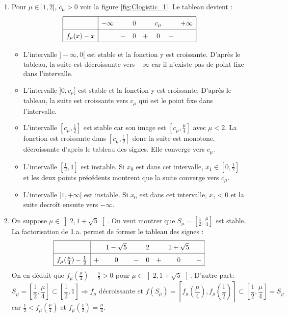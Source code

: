 \begin{enumerate}
 \item Pour $\mu \in ]1,2[$, $c_\mu >0$ voir la figure \ref{fig:Clogistic_1}. Le tableau devient :
\begin{displaymath}
\renewcommand{\arraystretch}{1.5}
 \begin{array}{|c|ccccccc|} \hline
           & -\infty &   & 0 &   & c_\mu &   & +\infty \\ \hline
f_\mu(x)-x &         & - & 0 & + & 0     & - & \\ \hline
\end{array}
\end{displaymath}
\begin{itemize}
 \item L'intervalle $]-\infty,0[$ est stable et la fonction y est croissante. D'après le tableau, la suite est  décroissante vers $-\infty$ car il n'existe pas de point fixe dans l'intervalle. 
\item L'intervalle $]0,c_\mu]$ est stable et la fonction y est croissante. D'après le tableau, la suite est  croissante vers $c_\mu$ qui est le point fixe dans l'intervalle.
\item L'intervalle $[c_\mu,\frac{1}{2}]$ est stable car son image est $[c_\mu,\frac{\mu}{4}]$ avec $\mu<2$. La fonction est croissante dans $[c_\mu,\frac{1}{2}]$ donc la suite est monotone, décroissante d'après le tableau des signes. Elle converge vers $c_\mu$.
\item L'intervalle $[\frac{1}{2},1]$ est instable. Si $x_0$ est dans cet intervalle, $x_1\in [0,\frac{1}{2}]$ et les deux points précédents montrent que la suite converge vers $c_\mu$.
\item L'intervalle $]1,+\infty[$ est instable. Si $x_0$ est dans cet intervalle, $x_1<0$ et la suite decroît ensuite vers $-\infty$.
\end{itemize}

\item On suppose $\mu \in \left] 2, 1 + \sqrt{5}\right[$. On veut montrer que $S_\mu = \left[ \frac{1}{2},\frac{\mu}{4}\right]$ est stable. La factorisation de 1.a. permet de former le tableau des signes :
\begin{displaymath}
\renewcommand{\arraystretch}{1.5}
\begin{array}{|l|ccccccc|} \hline
                                 &   & 1-\sqrt{5} &   & 2 &   & 1+\sqrt{5} &  \\ \hline 
f_\mu(\frac{\mu}{4})-\frac{1}{2} & + & 0          & - & 0 & + & 0          & - \\ \hline
\end{array}
\end{displaymath}
On en déduit que $f_\mu(\frac{\mu}{4})-\frac{1}{2}>0$ pour $\mu \in \left] 2, 1 + \sqrt{5} \right[$. D'autre part:
\[
 S_\mu = [\frac{1}{2},\frac{\mu}{4}] \subset [\frac{1}{2},1] 
 \Rightarrow f_\mu \text{ décroissante et } 
 f(S_\mu) = \left[ f_\mu(\frac{\mu}{4}),f_\mu(\frac{1}{2}) \right] \subset \left[ \frac{1}{2},\frac{\mu}{4} \right] = S_\mu 
\]
car $\frac{1}{2}<f_\mu(\frac{\mu}{4})$ et $f_\mu(\frac{1}{2}) = \frac{\mu}{4}$.


\end{enumerate}
